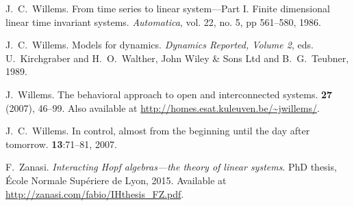 \begin{thebibliography}{RSW00}
    J.\ C.\ Willems.
    \newblock From time series to linear system---Part I.
    Finite dimensional linear time invariant systems.
    \newblock \emph{Automatica}, vol.  22, no. 5, pp 561--580, 1986. 

    J.\ C.\ Willems.
    \newblock Models for dynamics.
    \newblock \emph{Dynamics Reported,
    Volume 2}, eds. U.\ Kirchgraber and H.\ O.\ Walther, John Wiley \& Sons
    Ltd and B.\ G.\ Teubner, 1989.

    J.\ Willems.
    \newblock The behavioral approach to open and interconnected
    systems.
     {\bf 27} (2007), 46--99.
    \newblock Also available at
    \href{http://homes.esat.kuleuven.be/~jwillems/}  
    {http://homes.esat.kuleuven.be/\~{}jwillems/}.

    J.\ C.\ Willems.
    \newblock In control, almost from the beginning until the day
    after tomorrow.
     {\bf 13}:71--81, 2007. 

     F.\ Zanasi. 
    \newblock \emph{Interacting Hopf algebras---the theory of linear
    systems}. 
    \newblock PhD thesis, \'Ecole Normale Sup\'eriere de Lyon, 2015. 
    \newblock Available
    at \href{http://zanasi.com/fabio/IHthesis_FZ.pdf}
    {http://zanasi.com/fabio/IHthesis\_FZ.pdf}.

\end{thebibliography}


